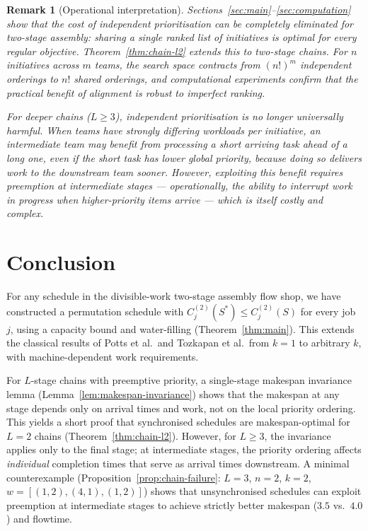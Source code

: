 \documentclass[11pt,titlepage]{article}
\newtheorem{remark}[theorem]{Remark}
\begin{document}
\begin{remark}[Operational interpretation]
\label{rem:operational}
Sections~\ref{sec:main}--\ref{sec:computation} show that the
cost of independent prioritisation can be completely eliminated
for two-stage assembly: sharing a single ranked list of
initiatives is optimal for every regular objective.
Theorem~\ref{thm:chain-l2} extends this to two-stage chains.
For $n$ initiatives across $m$ teams, the search space
contracts from $(n!)^m$ independent orderings to $n!$ shared
orderings, and computational experiments confirm that the
practical benefit of alignment is robust to imperfect ranking.

For deeper chains ($L \geq 3$), independent prioritisation is
no longer universally harmful. When teams have strongly
differing workloads per initiative, an intermediate team may
benefit from processing a short arriving task ahead of a long
one, even if the short task has lower global priority, because
doing so delivers work to the downstream team sooner. However,
exploiting this benefit requires preemption at intermediate
stages --- operationally, the ability to interrupt work in
progress when higher-priority items arrive --- which is itself
costly and complex.
\end{remark}

\section{Conclusion}

For any schedule in the divisible-work two-stage assembly flow
shop, we have constructed a permutation schedule with
$C^{(2)}_j(S^*) \leq C^{(2)}_j(S)$ for every job~$j$, using
a capacity bound and water-filling (Theorem~\ref{thm:main}).
This extends the classical results of Potts et al.\ and
Tozkapan et al.\ from $k = 1$ to arbitrary $k$, with
machine-dependent work requirements.

For $L$-stage chains with preemptive priority, a single-stage
makespan invariance lemma (Lemma~\ref{lem:makespan-invariance})
shows that the makespan at any stage depends only on arrival
times and work, not on the local priority ordering. This
yields a short proof that synchronised schedules are
makespan-optimal for $L = 2$ chains
(Theorem~\ref{thm:chain-l2}). However, for $L \geq 3$,
the invariance applies only to the final stage; at
intermediate stages, the priority ordering affects
\emph{individual} completion times that serve as arrival
times downstream. A minimal counterexample
(Proposition~\ref{prop:chain-failure}: $L = 3$, $n = 2$,
$k = 2$, $w = [(1,2),(4,1),(1,2)]$) shows that
unsynchronised schedules can exploit preemption at
intermediate stages to achieve strictly better makespan
($3.5$ vs.\ $4.0$) and flowtime.
\end{document}

